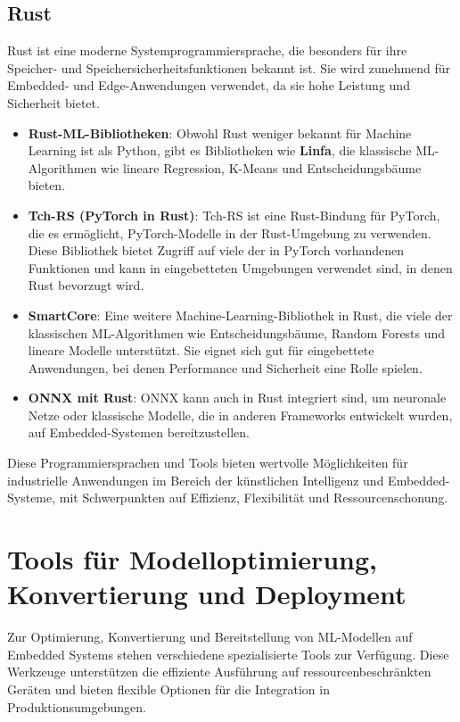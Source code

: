 \subsection{Rust}
Rust ist eine moderne Systemprogrammiersprache, die besonders für ihre Speicher- und Speichersicherheitsfunktionen bekannt ist. 
Sie wird zunehmend für Embedded- und Edge-Anwendungen verwendet, da sie hohe Leistung und Sicherheit bietet\cite{arewelearningyet}.

\begin{itemize}
    \item \textbf{Rust-ML-Bibliotheken}: Obwohl Rust weniger bekannt für Machine Learning ist als Python, gibt es Bibliotheken wie \textbf{Linfa}, 
    die klassische ML-Algorithmen wie lineare Regression, K-Means und Entscheidungsbäume bieten.

    \item \textbf{Tch-RS (PyTorch in Rust)}: Tch-RS ist eine Rust-Bindung für PyTorch, die es ermöglicht, PyTorch-Modelle in der Rust-Umgebung zu verwenden. 
    Diese Bibliothek bietet Zugriff auf viele der in PyTorch vorhandenen Funktionen und kann in eingebetteten Umgebungen verwendet sind, in denen Rust bevorzugt wird.

    \item \textbf{SmartCore}: Eine weitere Machine-Learning-Bibliothek in Rust, die viele der klassischen ML-Algorithmen wie Entscheidungsbäume, 
    Random Forests und lineare Modelle unterstützt. Sie eignet sich gut für eingebettete Anwendungen, bei denen Performance und Sicherheit eine Rolle spielen.

    \item \textbf{ONNX mit Rust}: ONNX kann auch in Rust integriert sind, um neuronale Netze oder klassische Modelle, die in anderen Frameworks entwickelt wurden, 
    auf Embedded-Systemen bereitzustellen.
\end{itemize}

Diese Programmiersprachen und Tools bieten wertvolle Möglichkeiten für industrielle Anwendungen im Bereich der künstlichen Intelligenz und Embedded-Systeme, 
mit Schwerpunkten auf Effizienz, Flexibilität und Ressourcenschonung.

\section{Tools für Modelloptimierung, Konvertierung und Deployment}

Zur Optimierung, Konvertierung und Bereitstellung von ML-Modellen auf Embedded Systems stehen verschiedene spezialisierte Tools zur Verfügung. 
Diese Werkzeuge unterstützen die effiziente Ausführung auf ressourcenbeschränkten Geräten und bieten flexible Optionen für die Integration in Produktionsumgebungen.

